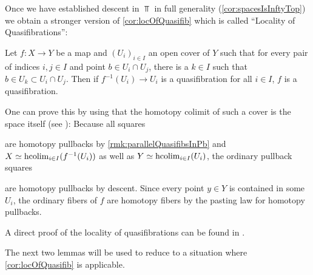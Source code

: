 \begin{remark}\label{rmk:locOfQuasifibDescent}
    Once we have established descent in $\Top$ in full generality (\cref{cor:spacesIsInftyTop}) we obtain a stronger version of \cref{cor:locOfQuasifib} which is called ``Locality of Quasifibrations'':
    
    Let $f\colon X\to Y$ be a map and $(U_i)_{i\in I}$ an open cover of $Y$ such that for every pair of indices $i,j\in I$ and point $b\in U_i\cap U_j$, there is a $k\in I$ such that $b\in U_k\subset U_i\cap U_j$.
    Then if $f^{-1}(U_i)\to U_i$ is a quasifibration for all $i\in I$, $f$ is a quasifibration.

    One can prove this by using that the homotopy colimit of such a cover is the space itself (see \cite[Proposition 4.6 (c)]{hypercovers}):
    Because all squares
    \begin{center}
    \end{center}
    are homotopy pullbacks by \cref{rmk:parallelQuasifibsInPb} and $X\simeq\operatorname{hcolim}\limits_{i\in I}(f^{-1}(U_i))$ as well as $Y\simeq\operatorname{hcolim}\limits_{i\in I}(U_i)$, the ordinary pullback squares 
    \begin{center}
    \end{center}
    are homotopy pullbacks by descent.
    Since every point $y\in Y$ is contained in some $U_i$, the ordinary fibers of $f$ are homotopy fibers by the pasting law for homotopy pullbacks. 

    A direct proof of the locality of quasifibrations can be found in \cite[Theorem A.1.2]{aguilar2002algebraic}.
\end{remark}
The next two lemmas will be used to reduce to a situation where \cref{cor:locOfQuasifib} is applicable.
